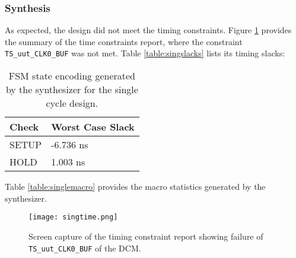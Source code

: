 \documentclass[paper=usletter, fontsize=12pt]{article}
\begin{document}
        \subsubsection{Synthesis} As expected, the design did not meet the
        timing constraints. Figure \ref{fig:singtime} provides the summary of
        the time constraints report, where the constraint
        \texttt{TS\_uut\_CLK0\_BUF} was not met. Table \ref{table:singslacks} lists its timing slacks:
        \begin{table}[h]
            \caption{FSM state encoding generated by the synthesizer for the
            single cycle design.}
            \label{table:singleslacks}
            \centering
            \begin{tabular}{ m{5em}m{10em} }
                \hline
                \textbf{Check}  &   \textbf{Worst Case Slack} \\
                \hline
                SETUP           &   -6.736 ns \\
                HOLD            &   1.003 ns \\
                \hline
            \end{tabular}
        \end{table}

        Table \ref{table:singlemacro} provides the macro statistics generated
        by the synthesizer.

        \begin{figure}[ht]
            \begin{center}
                \texttt{[image: singtime.png]}
                \caption{Screen capture of the timing constraint report showing
                failure of \texttt{TS\_uut\_CLK0\_BUF} of the DCM.}
                \label{fig:singtime}
            \end{center}
        \end{figure}
\end{document}
